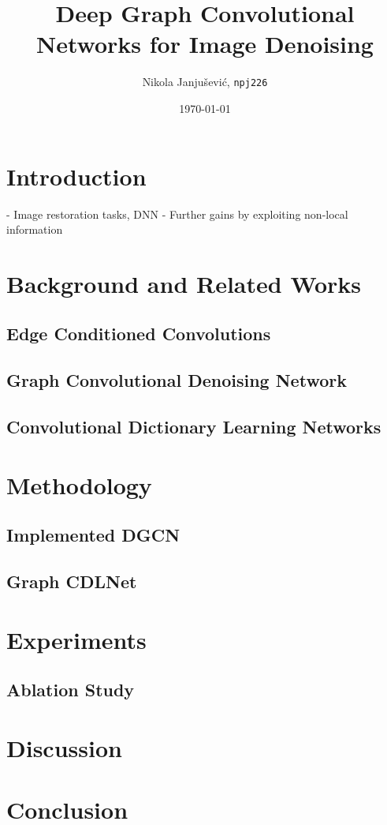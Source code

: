 \documentclass[12pt,a4paper,reqno]{amsart}
\title{Deep Graph Convolutional Networks for Image Denoising}
\author{Nikola Janju\v{s}evi\'{c}, \texttt{npj226}}
\date{\today}
\begin{document}
\maketitle

\section{Introduction}
- Image restoration tasks, DNN
- Further gains by exploiting non-local information

\section{Background and Related Works}
\subsection{Edge Conditioned Convolutions}
\subsection{Graph Convolutional Denoising Network}
\subsection{Convolutional Dictionary Learning Networks}

\section{Methodology}
\subsection{Implemented DGCN}
\subsection{Graph CDLNet}

\section{Experiments}
\subsection{Ablation Study}

\section{Discussion}
\section{Conclusion}
\end{document}
